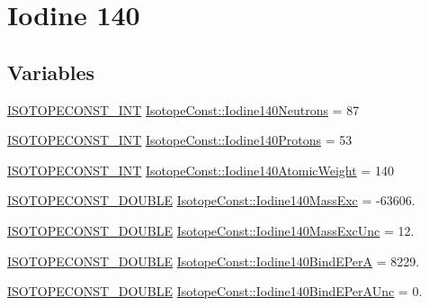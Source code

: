 \hypertarget{group___isotope_const-_iodine-_i140}{}\section{Iodine 140}
\label{group___isotope_const-_iodine-_i140}
\subsection*{Variables}
\begin{DoxyCompactItemize}
\item 
\mbox{\hyperlink{group___isotope_const-_macros_ga5f18360b3e99483a35c32d789e62621c}{I\+S\+O\+T\+O\+P\+E\+C\+O\+N\+S\+T\+\_\+\+I\+NT}} \mbox{\hyperlink{group___isotope_const-_iodine-_i140_ga291c19140b2711ffe69b7a7dbc1dc839}{Isotope\+Const\+::\+Iodine140\+Neutrons}} = 87
\item 
\mbox{\hyperlink{group___isotope_const-_macros_ga5f18360b3e99483a35c32d789e62621c}{I\+S\+O\+T\+O\+P\+E\+C\+O\+N\+S\+T\+\_\+\+I\+NT}} \mbox{\hyperlink{group___isotope_const-_iodine-_i140_gaedc6613ef8dfbb703b1c38315d1afe5e}{Isotope\+Const\+::\+Iodine140\+Protons}} = 53
\item 
\mbox{\hyperlink{group___isotope_const-_macros_ga5f18360b3e99483a35c32d789e62621c}{I\+S\+O\+T\+O\+P\+E\+C\+O\+N\+S\+T\+\_\+\+I\+NT}} \mbox{\hyperlink{group___isotope_const-_iodine-_i140_gada367d16a54466f7d3eabaf792f9b4da}{Isotope\+Const\+::\+Iodine140\+Atomic\+Weight}} = 140
\item 
\mbox{\hyperlink{group___isotope_const-_macros_ga8f45a7272ce02c0b4c65c44636ed719a}{I\+S\+O\+T\+O\+P\+E\+C\+O\+N\+S\+T\+\_\+\+D\+O\+U\+B\+LE}} \mbox{\hyperlink{group___isotope_const-_iodine-_i140_ga552f3fae3eec0e5f8810e64d4e3ae8d8}{Isotope\+Const\+::\+Iodine140\+Mass\+Exc}} = -\/63606.
\item 
\mbox{\hyperlink{group___isotope_const-_macros_ga8f45a7272ce02c0b4c65c44636ed719a}{I\+S\+O\+T\+O\+P\+E\+C\+O\+N\+S\+T\+\_\+\+D\+O\+U\+B\+LE}} \mbox{\hyperlink{group___isotope_const-_iodine-_i140_ga4272b19403db72c1d254cc3bf7edae36}{Isotope\+Const\+::\+Iodine140\+Mass\+Exc\+Unc}} = 12.
\item 
\mbox{\hyperlink{group___isotope_const-_macros_ga8f45a7272ce02c0b4c65c44636ed719a}{I\+S\+O\+T\+O\+P\+E\+C\+O\+N\+S\+T\+\_\+\+D\+O\+U\+B\+LE}} \mbox{\hyperlink{group___isotope_const-_iodine-_i140_gac7b5c78ef2fec5e5591351bac63a95e4}{Isotope\+Const\+::\+Iodine140\+Bind\+E\+PerA}} = 8229.
\item 
\mbox{\hyperlink{group___isotope_const-_macros_ga8f45a7272ce02c0b4c65c44636ed719a}{I\+S\+O\+T\+O\+P\+E\+C\+O\+N\+S\+T\+\_\+\+D\+O\+U\+B\+LE}} \mbox{\hyperlink{group___isotope_const-_iodine-_i140_ga538bdee1c1a1600aa739279b5904a03d}{Isotope\+Const\+::\+Iodine140\+Bind\+E\+Per\+A\+Unc}} = 0.

\end{DoxyCompactItemize}
